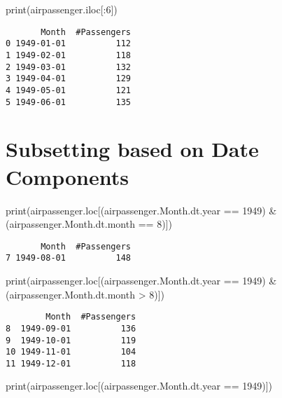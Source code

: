 \documentclass[
  letterpaper,
  DIV=11,
  numbers=noendperiod]{scrreprt}
\newenvironment{Shaded}{\begin{snugshade}}{\end{snugshade}}
\newcommand{\BuiltInTok}[1]{\textcolor[rgb]{0.00,0.23,0.31}{#1}}
\newcommand{\DecValTok}[1]{\textcolor[rgb]{0.68,0.00,0.00}{#1}}
\newcommand{\NormalTok}[1]{\textcolor[rgb]{0.00,0.23,0.31}{#1}}
\newcommand{\OperatorTok}[1]{\textcolor[rgb]{0.37,0.37,0.37}{#1}}
\begin{document}
\begin{Shaded}
\begin{Highlighting}[]
\BuiltInTok{print}\NormalTok{(airpassenger.iloc[:}\DecValTok{6}\NormalTok{])}
\end{Highlighting}
\end{Shaded}

\begin{verbatim}
       Month  #Passengers
0 1949-01-01          112
1 1949-02-01          118
2 1949-03-01          132
3 1949-04-01          129
4 1949-05-01          121
5 1949-06-01          135
\end{verbatim}

\hypertarget{subsetting-based-on-date-components}{%
\section{Subsetting based on Date
Components}\label{subsetting-based-on-date-components}}

\begin{Shaded}
\begin{Highlighting}[]
\BuiltInTok{print}\NormalTok{(airpassenger.loc[(airpassenger.Month.dt.year }\OperatorTok{==} \DecValTok{1949}\NormalTok{) }\OperatorTok{\&}\NormalTok{ (airpassenger.Month.dt.month }\OperatorTok{==} \DecValTok{8}\NormalTok{)])}
\end{Highlighting}
\end{Shaded}

\begin{verbatim}
       Month  #Passengers
7 1949-08-01          148
\end{verbatim}

\begin{Shaded}
\begin{Highlighting}[]
\BuiltInTok{print}\NormalTok{(airpassenger.loc[(airpassenger.Month.dt.year }\OperatorTok{==} \DecValTok{1949}\NormalTok{) }\OperatorTok{\&}\NormalTok{ (airpassenger.Month.dt.month }\OperatorTok{\textgreater{}} \DecValTok{8}\NormalTok{)])}
\end{Highlighting}
\end{Shaded}

\begin{verbatim}
        Month  #Passengers
8  1949-09-01          136
9  1949-10-01          119
10 1949-11-01          104
11 1949-12-01          118
\end{verbatim}

\begin{Shaded}
\begin{Highlighting}[]
\BuiltInTok{print}\NormalTok{(airpassenger.loc[(airpassenger.Month.dt.year }\OperatorTok{==} \DecValTok{1949}\NormalTok{)])}
\end{Highlighting}
\end{Shaded}
\end{document}
